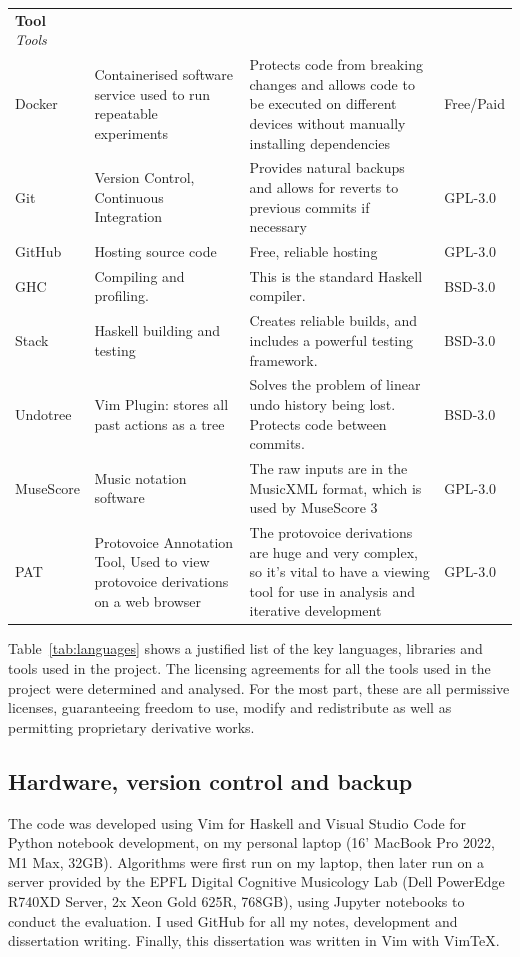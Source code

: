 \documentclass[12pt,a4paper,twoside,openany]{report} \usepackage[pdfborder={0 0 0}]{hyperref}    %
\theoremstyle{definition} \newtheorem{definition}{Definition}[section]
\begin{document}
\begin{table}[h!]
\begin{tabularx}{\textwidth}{p{4em}X X p{4em}} {\normalsize \textbf{Tool}}
        \textit{Tools} &&&\\ Docker & Containerised software service used to run repeatable experiments
                       & Protects code from breaking changes and allows code to be executed on
        different devices without manually installing dependencies & Free/Paid \\ Git & Version Control, Continuous Integration & Provides natural backups and
        allows for reverts to previous commits if necessary & GPL-3.0 \\ GitHub & Hosting source code & Free, reliable
        hosting & GPL-3.0 \\ GHC & Compiling and profiling. & This is the standard Haskell compiler. & BSD-3.0 \\ Stack
                & Haskell building and testing  & Creates reliable builds, and includes a powerful testing framework.
                & BSD-3.0 \\ Undotree & Vim Plugin: stores all past actions as a tree & Solves the problem of linear
        undo history being lost. Protects code between commits. & BSD-3.0 \\ MuseScore & Music notation software & The
        raw inputs are in the MusicXML format, which is used by MuseScore 3 & GPL-3.0 \\ PAT & Protovoice Annotation
        Tool, Used to view protovoice derivations on a web browser & The protovoice derivations are huge and very
      complex, so it's vital to have a viewing tool for use in analysis and iterative development & GPL-3.0 \\
    \end{tabularx} \end{table}

    Table~\ref{tab:languages} shows a justified list of the key languages, libraries and tools used in the project. The
    licensing agreements for all the tools used in the project were determined and analysed. For the most part, these
    are all permissive licenses, guaranteeing freedom to use, modify and redistribute as well as permitting proprietary
    derivative works. 

    \subsection{Hardware, version control and backup} 
    \label{sub:hardware}
    The code was developed using Vim for Haskell and Visual Studio
    Code for Python notebook development, on my personal laptop (16' MacBook Pro 2022, M1 Max, 32GB). Algorithms
    were first run on my laptop, then later run on a server provided by the EPFL Digital Cognitive Musicology Lab (Dell PowerEdge R740XD Server, 2x Xeon Gold
    625R, 768GB), using Jupyter notebooks to conduct the evaluation. I used GitHub for all my notes, development and
    dissertation writing. Finally, this dissertation was written in Vim with VimTeX.
\end{document}
